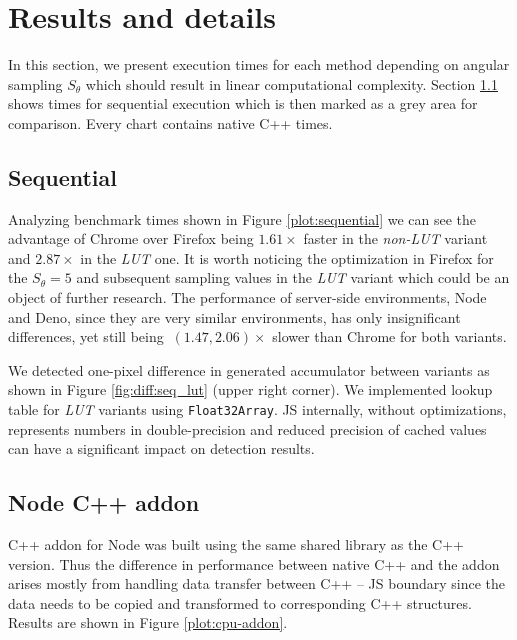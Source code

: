 \section{Results and details}\label{sec:results}
In this section, we present execution times for each method depending on angular sampling $S_\theta$ which should result in linear computational complexity. Section \ref{sec:results:sequential} shows times for sequential execution which is then marked as a grey area for comparison. Every chart contains native C++ times. 

\subsection{Sequential}\label{sec:results:sequential}

Analyzing benchmark times shown in Figure \ref{plot:sequential} we can see the advantage of Chrome over Firefox being $1.61\times$ faster in the \textit{non-LUT} variant and $2.87\times$ in the \textit{LUT} one. It is worth noticing the optimization in Firefox for the $S_\theta=5$ and subsequent sampling values in the \textit{LUT} variant which could be an object of further research. The performance of server-side environments, Node and Deno, since they are very similar environments, has only insignificant differences, yet still being $~(1.47, 2.06)\times$ slower than Chrome for both variants.




We detected one-pixel difference in generated accumulator between variants as shown in Figure \ref{fig:diff:seq_lut} (upper right corner). We implemented lookup table for \textit{LUT} variants using \texttt{Float32Array}. JS internally, without optimizations, represents numbers in double-precision and reduced precision of cached values can have a significant impact on detection results.




\subsection{Node C++ addon}\label{sec:results:cpp-addon}

C++ addon for Node was built using the same shared library as the C++ version. Thus the difference in performance between native C++ and the addon arises mostly from handling data transfer between C++ -- JS boundary since the data needs to be copied and transformed to corresponding C++ structures. Results are shown in Figure \ref{plot:cpu-addon}.

